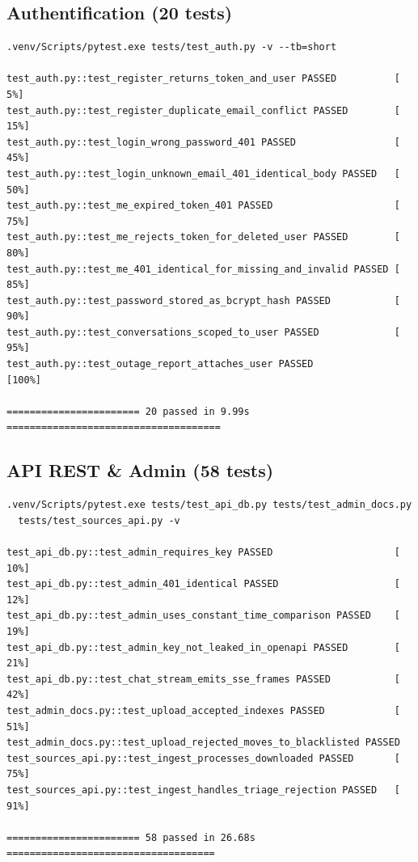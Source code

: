 \documentclass[12pt,a4paper,oneside]{article}
\begin{document}
\subsection{Authentification (20 tests)}

\begin{verbatim}
.venv/Scripts/pytest.exe tests/test_auth.py -v --tb=short

test_auth.py::test_register_returns_token_and_user PASSED          [  5%]
test_auth.py::test_register_duplicate_email_conflict PASSED        [ 15%]
test_auth.py::test_login_wrong_password_401 PASSED                 [ 45%]
test_auth.py::test_login_unknown_email_401_identical_body PASSED   [ 50%]
test_auth.py::test_me_expired_token_401 PASSED                     [ 75%]
test_auth.py::test_me_rejects_token_for_deleted_user PASSED        [ 80%]
test_auth.py::test_me_401_identical_for_missing_and_invalid PASSED [ 85%]
test_auth.py::test_password_stored_as_bcrypt_hash PASSED           [ 90%]
test_auth.py::test_conversations_scoped_to_user PASSED             [ 95%]
test_auth.py::test_outage_report_attaches_user PASSED             [100%]

======================= 20 passed in 9.99s =====================================
\end{verbatim}

\subsection{API REST \& Admin (58 tests)}

\begin{verbatim}
.venv/Scripts/pytest.exe tests/test_api_db.py tests/test_admin_docs.py
  tests/test_sources_api.py -v

test_api_db.py::test_admin_requires_key PASSED                     [ 10%]
test_api_db.py::test_admin_401_identical PASSED                    [ 12%]
test_api_db.py::test_admin_uses_constant_time_comparison PASSED    [ 19%]
test_api_db.py::test_admin_key_not_leaked_in_openapi PASSED        [ 21%]
test_api_db.py::test_chat_stream_emits_sse_frames PASSED           [ 42%]
test_admin_docs.py::test_upload_accepted_indexes PASSED            [ 51%]
test_admin_docs.py::test_upload_rejected_moves_to_blacklisted PASSED
test_sources_api.py::test_ingest_processes_downloaded PASSED       [ 75%]
test_sources_api.py::test_ingest_handles_triage_rejection PASSED   [ 91%]

======================= 58 passed in 26.68s ====================================
\end{verbatim}
\end{document}
